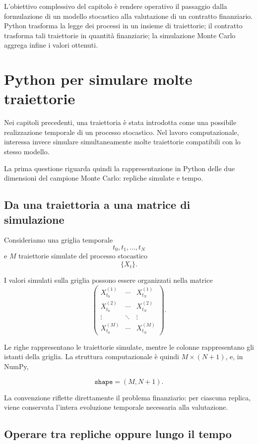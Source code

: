 L'obiettivo complessivo del capitolo \`e rendere operativo il passaggio
dalla formulazione di un modello stocastico alla valutazione di un
contratto finanziario. Python trasforma la legge dei processi in un insieme
di traiettorie; il contratto trasforma tali traiettorie in quantit\`a
finanziarie; la simulazione Monte Carlo aggrega infine i valori ottenuti.


\section{Python per simulare molte traiettorie}

Nei capitoli precedenti, una traiettoria \`e stata introdotta come una
possibile realizzazione temporale di un processo stocastico. Nel lavoro
computazionale, interessa invece simulare simultaneamente molte traiettorie
compatibili con lo stesso modello.

La prima questione riguarda quindi la rappresentazione in Python delle due
dimensioni del campione Monte Carlo: repliche simulate e tempo.

\subsection{Da una traiettoria a una matrice di simulazione}

Consideriamo una griglia temporale
\[
t_0,t_1,\ldots,t_N
\]
e \(M\) traiettorie simulate del processo stocastico
\[
\{X_t\}.
\]

I valori simulati sulla griglia possono essere organizzati nella matrice
\[
\begin{pmatrix}
X_{t_0}^{(1)} & \cdots & X_{t_N}^{(1)}\\
X_{t_0}^{(2)} & \cdots & X_{t_N}^{(2)}\\
\vdots & \ddots & \vdots\\
X_{t_0}^{(M)} & \cdots & X_{t_N}^{(M)}
\end{pmatrix}.
\]

Le righe rappresentano le traiettorie simulate, mentre le colonne
rappresentano gli istanti della griglia. La
struttura computazionale \`e quindi $M\times(N+1)$, e, in NumPy,

\[
\texttt{shape}=(M,N+1).
\]

La convenzione riflette direttamente il problema finanziario: per ciascuna replica, viene conservata l'intera evoluzione temporale necessaria alla
valutazione.

\subsection{Operare tra repliche oppure lungo il tempo}


